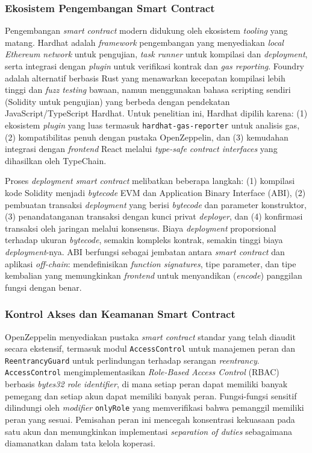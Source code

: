 \subsubsection{Ekosistem Pengembangan Smart Contract}

Pengembangan \textit{smart contract} modern didukung oleh ekosistem \textit{tooling} yang matang. Hardhat \cite{hardhat} adalah \textit{framework} pengembangan yang menyediakan \textit{local Ethereum network} untuk pengujian, \textit{task runner} untuk kompilasi dan \textit{deployment}, serta integrasi dengan \textit{plugin} untuk verifikasi kontrak dan \textit{gas reporting}. Foundry \cite{foundry} adalah alternatif berbasis Rust yang menawarkan kecepatan kompilasi lebih tinggi dan \textit{fuzz testing} bawaan, namun menggunakan bahasa scripting sendiri (Solidity untuk pengujian) yang berbeda dengan pendekatan JavaScript/TypeScript Hardhat. Untuk penelitian ini, Hardhat dipilih karena: (1) ekosistem \textit{plugin} yang luas termasuk \texttt{hardhat-gas-reporter} untuk analisis gas, (2) kompatibilitas penuh dengan pustaka OpenZeppelin, dan (3) kemudahan integrasi dengan \textit{frontend} React melalui \textit{type-safe contract interfaces} yang dihasilkan oleh TypeChain.

Proses \textit{deployment smart contract} melibatkan beberapa langkah: (1) kompilasi kode Solidity menjadi \textit{bytecode} EVM dan Application Binary Interface (ABI), (2) pembuatan transaksi \textit{deployment} yang berisi \textit{bytecode} dan parameter konstruktor, (3) penandatanganan transaksi dengan kunci privat \textit{deployer}, dan (4) konfirmasi transaksi oleh jaringan melalui konsensus. Biaya \textit{deployment} proporsional terhadap ukuran \textit{bytecode}, semakin kompleks kontrak, semakin tinggi biaya \textit{deployment}-nya. ABI berfungsi sebagai jembatan antara \textit{smart contract} dan aplikasi \textit{off-chain}: mendefinisikan \textit{function signatures}, tipe parameter, dan tipe kembalian yang memungkinkan \textit{frontend} untuk menyandikan (\textit{encode}) panggilan fungsi dengan benar.

\subsubsection{Kontrol Akses dan Keamanan Smart Contract}

OpenZeppelin \cite{openzeppelin} menyediakan pustaka \textit{smart contract} standar yang telah diaudit secara ekstensif, termasuk modul \texttt{AccessControl} untuk manajemen peran dan \texttt{ReentrancyGuard} untuk perlindungan terhadap serangan \textit{reentrancy}. \texttt{AccessControl} mengimplementasikan \textit{Role-Based Access Control} (RBAC) berbasis \textit{bytes32 role identifier}, di mana setiap peran dapat memiliki banyak pemegang dan setiap akun dapat memiliki banyak peran. Fungsi-fungsi sensitif dilindungi oleh \textit{modifier} \texttt{onlyRole} yang memverifikasi bahwa pemanggil memiliki peran yang sesuai. Pemisahan peran ini mencegah konsentrasi kekuasaan pada satu akun dan memungkinkan implementasi \textit{separation of duties} sebagaimana diamanatkan dalam tata kelola koperasi.

